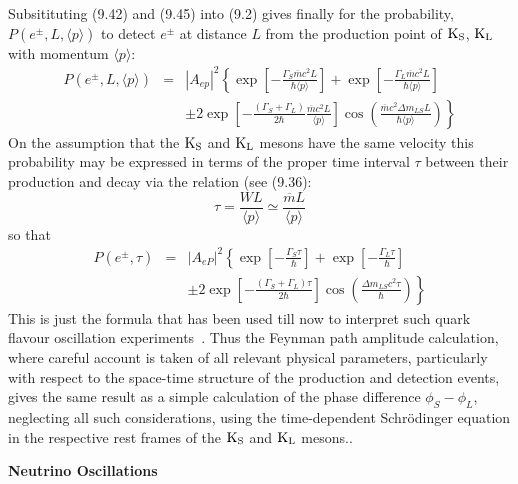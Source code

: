 \documentclass [12pt]{article}
\begin{document}
{   Subsitituting (9.42) and (9.45) into (9.2) gives finally for the probability,
  $ P(e^{\pm},L,\langle p \rangle)$ to detect $e^{\pm}$ at distance
  $L$ from the production point of ${\rm K_S}$, ${\rm K_L}$ with momentum $ \langle p \rangle$:
      \begin{eqnarray}
  P(e^{\pm},L,\langle p \rangle) &  =  & |A_{ep}|^2\left\{ \exp\left[-\frac{\Gamma_S \overline{m}c^2 L}
   { \hbar \langle p \rangle}\right]
  +\exp\left[-\frac{\Gamma_L \overline{m}c^2 L}{ \hbar \langle p \rangle}\right] \right. \nonumber \\
   &  &\pm 2 \left. \exp\left[-\frac{(\Gamma_S+\Gamma_L)}{2 \hbar }\frac{\overline{m}c^2 L}{ \langle p \rangle }
  \right] \cos \left(\frac{\overline{m}c^2 \Delta m_{LS} L}{\hbar \langle p \rangle} \right)\right\}    
      \end{eqnarray} 
  On the assumption that the  ${\rm K_S}$ and ${\rm K_L}$ mesons have the same velocity this probability
 may be expressed in terms of the proper time interval $\tau$ between their production and decay via the 
  relation (see (9.36):
  \begin{equation}
    \tau = \frac{W L}{ \langle p \rangle } \simeq \frac{\overline{m} L}{ \langle p \rangle}
  \end{equation}
  so that 
      \begin{eqnarray}
  P(e^{\pm},\tau) &  =  & |A_{eP}|^2 \left\{ \exp \left[-\frac{\Gamma_S \tau}{\hbar}\right]
  +\exp \left[-\frac{\Gamma_L \tau}{\hbar}\right] \right. \nonumber \\
   &  &  \pm 2 \left. \exp \left[-\frac{(\Gamma_S+\Gamma_L) \tau}{2 \hbar}
  \right] \cos \left(\frac{\Delta m_{LS} c^2 \tau}{\hbar} \right)\right\}    
      \end{eqnarray}                    
 This is just the formula that has been used till now to interpret such quark flavour oscillation
  experiments~\cite{DSDQ,JACK,CPLEAR}. Thus the Feynman path amplitude calculation,
 where careful account is taken of all relevant physical parameters, particularly with 
 respect to the space-time structure of the production and detection events, gives the
 same result as a simple calculation of the phase difference
 $\phi_S-\phi_L$, neglecting all such considerations, using the time-dependent Schr\"{o}dinger equation in the
 respective rest frames of the ${\rm K_S}$ and ${\rm K_L}$ mesons..

\par {\bf \Large Neutrino Oscillations}

}
\end{document}
